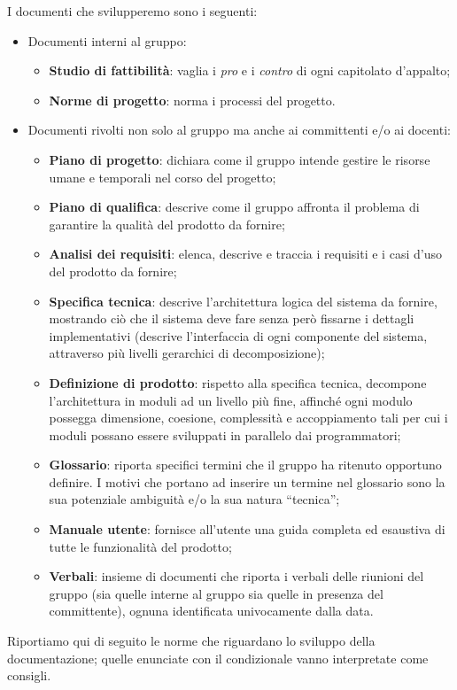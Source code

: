 I documenti che svilupperemo sono i seguenti:
\begin{itemize}
	\item Documenti interni al gruppo:
	\begin{itemize}
		\item \textbf{Studio di fattibilità}: vaglia i \emph{pro} e i \emph{contro} di ogni capitolato d'appalto;
		\item \textbf{Norme di progetto}: norma i processi del progetto.
	\end{itemize}
	\item Documenti rivolti non solo al gruppo ma anche ai committenti e/o ai docenti:
	\begin{itemize}
		\item \textbf{Piano di progetto}: dichiara come il gruppo intende gestire le risorse umane e temporali nel corso del progetto;
		\item \textbf{Piano di qualifica}: descrive come il gruppo affronta il problema di garantire la qualità del prodotto da fornire;
		\item \textbf{Analisi dei requisiti}: elenca, descrive e traccia i requisiti e i casi d'uso del prodotto da fornire;
		\item \textbf{Specifica tecnica}: descrive l'architettura logica del sistema da fornire, mostrando ciò che il sistema deve fare senza però fissarne i dettagli implementativi (descrive l'interfaccia di ogni componente del sistema, attraverso più livelli gerarchici di decomposizione);
		\item \textbf{Definizione di prodotto}: rispetto alla specifica tecnica, decompone l'architettura in moduli ad un livello più fine, affinché ogni modulo possegga dimensione, coesione, complessità e accoppiamento tali per cui i moduli possano essere sviluppati in parallelo dai programmatori;
		\item \textbf{Glossario}: riporta specifici termini che il gruppo ha ritenuto opportuno definire. I motivi che portano ad inserire un termine nel glossario sono la sua potenziale ambiguità e/o la sua natura “tecnica”;
		\item \textbf{Manuale utente}: fornisce all'utente una guida completa ed esaustiva di tutte le funzionalità del prodotto;
		\item \textbf{Verbali}: insieme di documenti che riporta i verbali delle riunioni del gruppo (sia quelle interne al gruppo sia quelle in presenza del committente), ognuna identificata univocamente dalla data.
	\end{itemize}
\end{itemize}
Riportiamo qui di seguito le norme che riguardano lo sviluppo della documentazione; quelle enunciate con il condizionale vanno interpretate come consigli.

